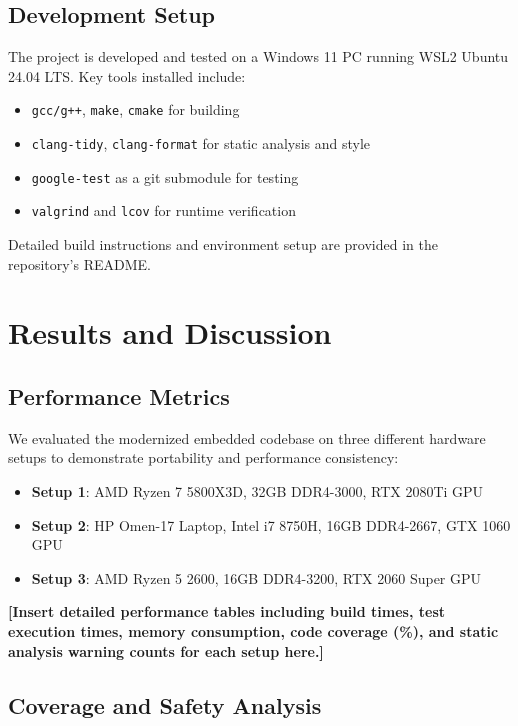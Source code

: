 \documentclass[conference]{IEEEtran}
\begin{document}
	\subsection{Development Setup}
	The project is developed and tested on a Windows 11 PC running WSL2 Ubuntu 24.04 LTS. Key tools installed include:
	
	\begin{itemize}
		\item \texttt{gcc/g++}, \texttt{make}, \texttt{cmake} for building
		\item \texttt{clang-tidy}, \texttt{clang-format} for static analysis and style
		\item \texttt{google-test} as a git submodule for testing
		\item \texttt{valgrind} and \texttt{lcov} for runtime verification
	\end{itemize}
	
	Detailed build instructions and environment setup are provided in the repository's README.
	
	\section{Results and Discussion}
	\label{sec.results_and_discussions}
	
	\subsection{Performance Metrics}
	
	We evaluated the modernized embedded codebase on three different hardware setups to demonstrate portability and performance consistency:
	
	\begin{itemize}
		\item \textbf{Setup 1}: AMD Ryzen 7 5800X3D, 32GB DDR4-3000, RTX 2080Ti GPU
		\item \textbf{Setup 2}: HP Omen-17 Laptop, Intel i7 8750H, 16GB DDR4-2667, GTX 1060 GPU
		\item \textbf{Setup 3}: AMD Ryzen 5 2600, 16GB DDR4-3200, RTX 2060 Super GPU
	\end{itemize}
	
	\textbf{[Insert detailed performance tables including build times, test execution times, memory consumption, code coverage (\%), and static analysis warning counts for each setup here.]}
	
	\subsection{Coverage and Safety Analysis}
	
\end{document}
